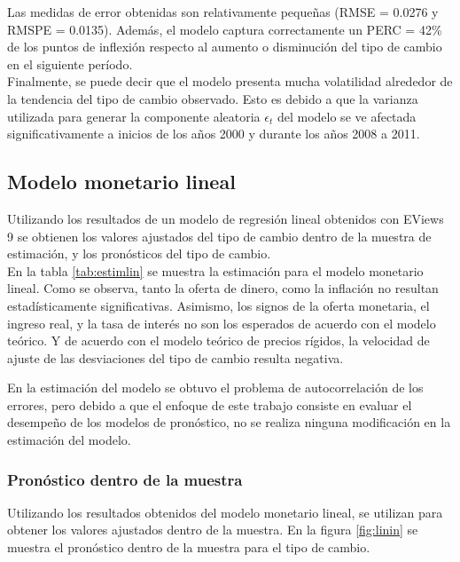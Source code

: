 Las medidas de error obtenidas son relativamente pequeñas (RMSE = 0.0276 y RMSPE = 0.0135). Además, el modelo captura correctamente un PERC = 42\% de los puntos de inflexión respecto al aumento o disminución del tipo de cambio en el siguiente período.\\

Finalmente, se puede decir que el modelo presenta mucha volatilidad alrededor de la tendencia del tipo de cambio observado. Esto es debido a que la varianza utilizada para generar la componente aleatoria $\epsilon_t$ del modelo se ve afectada significativamente a inicios de los años 2000 y durante los años 2008 a 2011.

\newpage
\subsection{Modelo monetario lineal}
Utilizando los resultados de un modelo de regresión lineal obtenidos con EViews 9 se obtienen los valores ajustados del tipo de cambio dentro de la muestra de estimación, y los pronósticos del tipo de cambio.\\

En la tabla \ref{tab:estimlin} se muestra la estimación para el modelo monetario lineal. Como se observa, tanto la oferta de dinero, como la inflación no resultan estadísticamente significativas. Asimismo, los signos de la oferta monetaria, el ingreso real, y la tasa de interés no son los esperados de acuerdo con el modelo teórico. Y de acuerdo con el modelo teórico de precios rígidos, la velocidad de ajuste de las desviaciones del tipo de cambio resulta negativa.



En la estimación del modelo se obtuvo el problema de autocorrelación de los errores, pero debido a que el enfoque de este trabajo consiste en evaluar el desempeño de los modelos de pronóstico, no se realiza ninguna modificación en la estimación del modelo.

\subsubsection{Pronóstico dentro de la muestra}
Utilizando los resultados obtenidos del modelo monetario lineal, se utilizan para obtener los valores ajustados dentro de la muestra. En la figura \ref{fig:linin} se muestra el pronóstico dentro de la muestra para el tipo de cambio.\\

